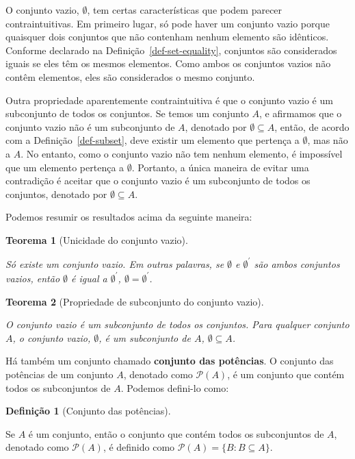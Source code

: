 \documentclass[
  letterpaper,
]{book}
\theoremstyle{definition}
\newtheorem{definition}{Definição}[chapter]
\theoremstyle{plain}
\newtheorem{theorem}{Teorema}[chapter]
\theoremstyle{remark}
\begin{document}
O conjunto vazio, \(\emptyset\), tem certas características que podem
parecer contraintuitivas. Em primeiro lugar, só pode haver um conjunto
vazio porque quaisquer dois conjuntos que não contenham nenhum elemento
são idênticos. Conforme declarado na Definição~\ref{def-set-equality},
conjuntos são considerados iguais se eles têm os mesmos elementos. Como
ambos os conjuntos vazios não contêm elementos, eles são considerados o
mesmo conjunto.

Outra propriedade aparentemente contraintuitiva é que o conjunto vazio é
um subconjunto de todos os conjuntos. Se temos um conjunto \(A\), e
afirmamos que o conjunto vazio não é um subconjunto de \(A\), denotado
por \(\emptyset \subseteq A\), então, de acordo com a
Definição~\ref{def-subset}, deve existir um elemento que pertença a
\(\emptyset\), mas não a \(A\). No entanto, como o conjunto vazio não
tem nenhum elemento, é impossível que um elemento pertença a
\(\emptyset\). Portanto, a única maneira de evitar uma contradição é
aceitar que o conjunto vazio é um subconjunto de todos os conjuntos,
denotado por \(\emptyset \subseteq A\).

Podemos resumir os resultados acima da seguinte maneira:

\begin{theorem}[Unicidade do conjunto
vazio]\protect\hypertarget{thm-empty-set-uniqueness}{}\label{thm-empty-set-uniqueness}

Só existe um conjunto vazio. Em outras palavras, se \(\emptyset\) e
\(\emptyset^{'}\) são ambos conjuntos vazios, então \(\emptyset\) é
igual a \(\emptyset^{'}\), \(\emptyset = \emptyset^{'}\).

\end{theorem}

\begin{theorem}[Propriedade de subconjunto do conjunto
vazio]\protect\hypertarget{thm-empty-set-subset}{}\label{thm-empty-set-subset}

O conjunto vazio é um subconjunto de todos os conjuntos. Para qualquer
conjunto \(A\), o conjunto vazio, \(\emptyset\), é um subconjunto de
\(A\), \(\emptyset \subseteq A\).

\end{theorem}

Há também um conjunto chamado \textbf{conjunto das potências}. O
conjunto das potências de um conjunto \(A\), denotado como
\(\mathcal{P}(A)\), é um conjunto que contém todos os subconjuntos de
\(A\). Podemos defini-lo como:

\begin{definition}[Conjunto das
potências]\protect\hypertarget{def-power-set}{}\label{def-power-set}

Se \(A\) é um conjunto, então o conjunto que contém todos os
subconjuntos de \(A\), denotado como \(\mathcal{P}(A)\), é definido como
\(\mathcal{P}(A) = \{ B: B \subseteq A \}\).

\end{definition}
\end{document}
